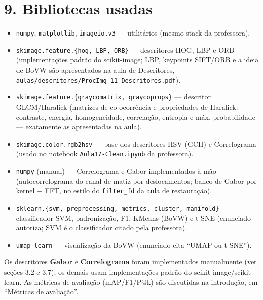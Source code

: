 \documentclass[12pt, a4paper]{article}
\begin{document}
\section*{9. Bibliotecas usadas}
\begin{itemize}
    \item \texttt{numpy}, \texttt{matplotlib}, \texttt{imageio.v3} --- utilitários (mesmo stack da professora).
    \item \texttt{skimage.feature.\{hog, LBP, ORB\}} --- descritores HOG, LBP e ORB (implementações padrão do scikit-image; LBP, keypoints SIFT/ORB e a ideia de BoVW são apresentados na aula de Descritores, \texttt{aulas/descritores/ProcImg\_11\_Descritores.pdf}).
    \item \texttt{skimage.feature.\{graycomatrix, graycoprops\}} --- descritor GLCM/Haralick (matrizes de co-ocorrência e propriedades de Haralick: contraste, energia, homogeneidade, correlação, entropia e máx. probabilidade --- exatamente as apresentadas na aula).
    \item \texttt{skimage.color.rgb2hsv} --- base dos descritores HSV (GCH) e Correlograma (usado no notebook \texttt{Aula17-Clean.ipynb} da professora).
    \item \texttt{numpy} (manual) --- Correlograma e Gabor implementados à mão (autocorrelograma do canal de matiz por deslocamentos; banco de Gabor por kernel + FFT, no estilo do \texttt{filter\_fd} da aula de restauração).
    \item \texttt{sklearn.\{svm, preprocessing, metrics, cluster, manifold\}} --- classificador SVM, padronização, F1, KMeans (BoVW) e t-SNE (enunciado autoriza; SVM é o classificador citado pela professora).
    \item \texttt{umap-learn} --- visualização da BoVW (enunciado cita ``UMAP ou t-SNE'').
\end{itemize}

Os descritores \textbf{Gabor} e \textbf{Correlograma} foram implementados manualmente (ver seções 3.2 e 3.7); os demais usam implementações padrão do scikit-image/scikit-learn. As métricas de avaliação (mAP/F1/P@k) são discutidas na introdução, em ``Métricas de avaliação''.
\end{document}
